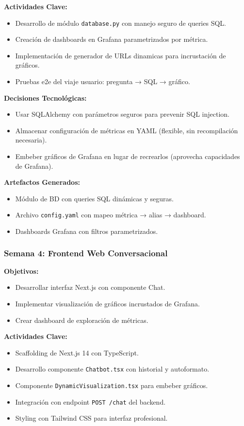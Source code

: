 \documentclass[11pt, a4paper]{report}
\begin{document}
\textbf{Actividades Clave:}
\begin{itemize}
    \item Desarrollo de módulo \texttt{database.py} con manejo seguro de queries SQL.
    \item Creación de dashboards en Grafana parametrizados por métrica.
    \item Implementación de generador de URLs dinamicas para incrustación de gráficos.
    \item Pruebas e2e del viaje usuario: pregunta → SQL → gráfico.
\end{itemize}

\textbf{Decisiones Tecnológicas:}
\begin{itemize}
    \item Usar SQLAlchemy con parámetros seguros para prevenir SQL injection.
    \item Almacenar configuración de métricas en YAML (flexible, sin recompilación necesaria).
    \item Embeber gráficos de Grafana en lugar de recrearlos (aprovecha capacidades de Grafana).
\end{itemize}

\textbf{Artefactos Generados:}
\begin{itemize}
    \item Módulo de BD con queries SQL dinámicas y seguras.
    \item Archivo \texttt{config.yaml} con mapeo métrica → alias → dashboard.
    \item Dashboards Grafana con filtros parametrizados.
\end{itemize}

\subsubsection{Semana 4: Frontend Web Conversacional}

\textbf{Objetivos:}
\begin{itemize}
    \item Desarrollar interfaz Next.js con componente Chat.
    \item Implementar visualización de gráficos incrustados de Grafana.
    \item Crear dashboard de exploración de métricas.
\end{itemize}

\textbf{Actividades Clave:}
\begin{itemize}
    \item Scaffolding de Next.js 14 con TypeScript.
    \item Desarrollo componente \texttt{Chatbot.tsx} con historial y autoformato.
    \item Componente \texttt{DynamicVisualization.tsx} para embeber gráficos.
    \item Integración con endpoint \texttt{POST /chat} del backend.
    \item Styling con Tailwind CSS para interfaz profesional.
\end{itemize}
\end{document}
